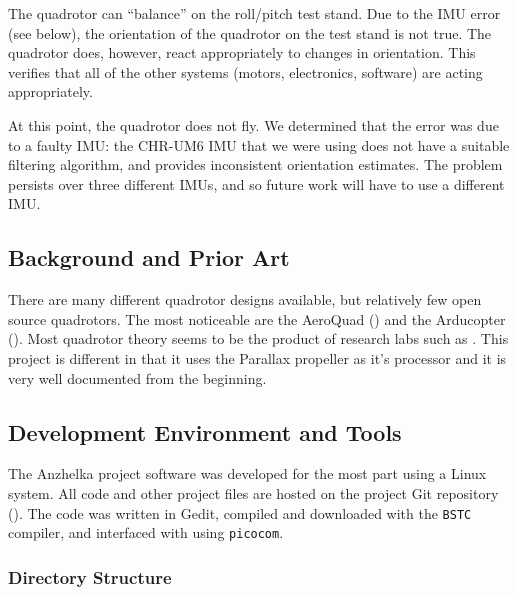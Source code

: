 \documentclass{article}
\numberwithin{equation}{section} %
\begin{document}
The quadrotor can ``balance'' on the roll/pitch test stand. Due to the IMU error (see below), the orientation of the quadrotor on the test stand is not true. The quadrotor does, however, react appropriately to changes in orientation. This verifies that all of the other systems (motors, electronics, software) are acting appropriately.

At this point, the quadrotor does not fly. We determined that the error was due to a faulty IMU: the CHR-UM6 IMU that we were using does not have a suitable filtering algorithm, and provides inconsistent orientation estimates. The problem persists over three different IMUs, and so future work will have to use a different IMU.

\subsection{Background and Prior Art}
There are many different quadrotor designs available, but relatively few open source quadrotors. The most noticeable are the AeroQuad (\cite{aeroquad}) and the Arducopter (\cite{arducopter}). Most quadrotor theory seems to be the product of research labs such as \cite{stingu09}. This project is different in that it uses the Parallax propeller as it's processor and it is very well documented from the beginning.

\subsection{Development Environment and Tools}

The Anzhelka project software was developed for the most part using a Linux system. All code and other project files are hosted on the project Git repository (\cite{anzhelka_code}). The 
 code was written in Gedit, compiled and downloaded with the \texttt{BSTC} compiler, and interfaced with using \texttt{picocom}.


\subsubsection{Directory Structure}
\end{document}
